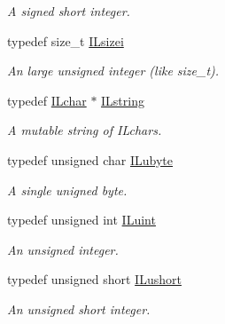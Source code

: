 \begin{DoxyCompactItemize}
\begin{DoxyCompactList}\small\item\em A signed short integer. \end{DoxyCompactList}\item 
\hypertarget{group__il__types_gad51812c5d3fd67d85973dd7a7cb80d8e}{typedef size\+\_\+t \hyperlink{group__il__types_gad51812c5d3fd67d85973dd7a7cb80d8e}{I\+Lsizei}}\label{group__il__types_gad51812c5d3fd67d85973dd7a7cb80d8e}

\begin{DoxyCompactList}\small\item\em An large unsigned integer (like size\+\_\+t). \end{DoxyCompactList}\item 
\hypertarget{group__il__types_ga683acc99ae9bac7978edfa5588962b52}{typedef \hyperlink{group__il__types_gabb6e047662a2e8131c5bcd785c84ff02}{I\+Lchar} $\ast$ \hyperlink{group__il__types_ga683acc99ae9bac7978edfa5588962b52}{I\+Lstring}}\label{group__il__types_ga683acc99ae9bac7978edfa5588962b52}

\begin{DoxyCompactList}\small\item\em A mutable string of {\itshape I\+Lchars}. \end{DoxyCompactList}\item 
\hypertarget{group__il__types_ga057357939bc5a12e8061715453568519}{typedef unsigned char \hyperlink{group__il__types_ga057357939bc5a12e8061715453568519}{I\+Lubyte}}\label{group__il__types_ga057357939bc5a12e8061715453568519}

\begin{DoxyCompactList}\small\item\em A single unigned byte. \end{DoxyCompactList}\item 
\hypertarget{group__il__types_gaff8e86a1072c8d7cfe387fb87c6ed8e1}{typedef unsigned int \hyperlink{group__il__types_gaff8e86a1072c8d7cfe387fb87c6ed8e1}{I\+Luint}}\label{group__il__types_gaff8e86a1072c8d7cfe387fb87c6ed8e1}

\begin{DoxyCompactList}\small\item\em An unsigned integer. \end{DoxyCompactList}\item 
\hypertarget{group__il__types_gac0f1c4cfe288e56c059cd2030f9682d5}{typedef unsigned short \hyperlink{group__il__types_gac0f1c4cfe288e56c059cd2030f9682d5}{I\+Lushort}}\label{group__il__types_gac0f1c4cfe288e56c059cd2030f9682d5}

\begin{DoxyCompactList}\small\item\em An unsigned short integer. \end{DoxyCompactList}\end{DoxyCompactItemize}


